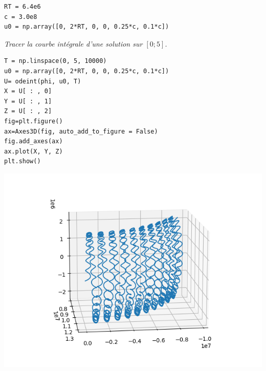\begin{lstlisting}
RT = 6.4e6
c = 3.0e8
u0 = np.array([0, 2*RT, 0, 0, 0.25*c, 0.1*c])
\end{lstlisting}
\begin{Exercise}\it
Tracer la courbe intégrale d'une solution sur $[0; 5]$.
\end{Exercise}
\begin{Answer}
\begin{lstlisting}
T = np.linspace(0, 5, 10000)
u0 = np.array([0, 2*RT, 0, 0, 0.25*c, 0.1*c])
U= odeint(phi, u0, T)
X = U[ : , 0]
Y = U[ : , 1]
Z = U[ : , 2]
fig=plt.figure()
ax=Axes3D(fig, auto_add_to_figure = False)
fig.add_axes(ax)
ax.plot(X, Y, Z)
plt.show()
\end{lstlisting}
\begin{center}
\includegraphics[width=14cm]{Cours/Images/ED2_vanHalen1.png}    
\end{center}
\begin{center}

\end{center}
\end{Answer}
